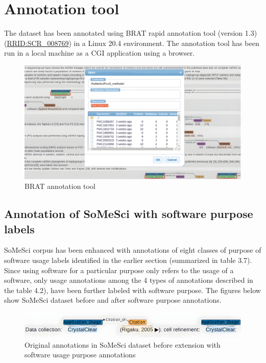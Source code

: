 \section{Annotation tool}
\label{sec:dataset:tool}
The dataset has been annotated using BRAT rapid annotation tool (version 1.3) (\href{https://scicrunch.org/resolver/SCR_008769}{RRID:SCR\_008769})  in a Linux 20.4 environment. The annotation tool has been run in a local machine as a \ac{CGI} application using a browser. 

\begin{figure}[htbp]
	\centering
	\includegraphics[width=.66\textwidth]{4.graphics/figures/ch_4/BRAT_tool}
	\caption{BRAT annotation tool}
	\label{fig:chapter04:setup}
\end{figure}

\subsection{Annotation of SoMeSci with software purpose labels}
\label{subsec:dataset:tool:Annotationprocess}

\ac{SoMeSci} corpus has been enhanced with annotations of eight classes of purpose of software usage labels  identified in the earlier section (summarized in table 3.7). Since using software for a particular purpose only refers to the usage of a software, only usage annotations among the 4 types of annotations described in the table 4.2), have been further labeled with software purpose. The figures below show \ac{SoMeSci} dataset before and after software purpose annotations. \\

\begin{figure}[htbp]
	\centering
	\includegraphics[width=.85\textwidth]{4.graphics/figures/ch_4/before_ann_hd_PMC3120364_FULLTEX_HD}
	\caption{Original annotations in \ac{SoMeSci} dataset before extension with software usage purpose annotations }
	\label{fig:chapter04:setup}
\end{figure}

